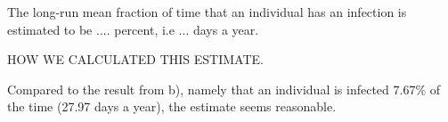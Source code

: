 The long-run mean fraction of time that an individual has an infection is estimated to be .... percent, i.e ... days a year.  

HOW WE CALCULATED THIS ESTIMATE.

Compared to the result from b), namely that an individual is infected $7.67\%$ of the time  (27.97 days a year), the estimate seems reasonable. 


